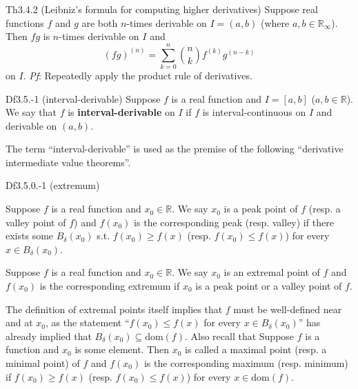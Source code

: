 \documentclass{article}
\begin{document}
\begin{Th}{Th3.4.2 (Leibniz's formula for computing higher derivatives)}
    Suppose real functions $f$ and $g$ are both $n$-times derivable on $I = (a,b)$ (where $a, b\in\mathbb{R}_\infty$). Then $fg$ is $n$-times derivable on $I$ and
    $$ (fg)^{(n)} = \sum_{k=0}^n \binom{n}{k} f^{(k)}g^{(n-k)}$$
    on $I$.
    \tcblower
    \textit{Pf}: Repeatedly apply the product rule of derivatives.
\end{Th}

\begin{Df}{Df3.5.-1 (interval-derivable)}
    Suppose $f$ is a real function and $I=[a,b]$ ($a,b\in\mathbb{R}$). We say that $f$ is \textbf{interval-derivable} on $I$ if $f$ is interval-continuous on $I$ and derivable on $(a,b)$.
\end{Df}

\begin{Rmk}{}
    The term ``interval-derivable'' is used as the premise of the following ``derivative intermediate value theorems''.
\end{Rmk}

\begin{Df}{Df3.5.0.-1 (extremum)}
    \begin{compactenum}
        \item Suppose $f$ is a real function and $x_0\in\mathbb{R}$. We say $x_0$ is a peak point of $f$ (resp. a valley point of $f$) and $f(x_0)$ is the corresponding peak (resp. valley) if there exists some $B_\delta(x_0)$ s.t. $f(x_0)\geq f(x)$ (resp. $f(x_0)\leq f(x)$) for every $x\in B_\delta(x_0)$.
        \item Suppose $f$ is a real function and $x_0\in\mathbb{R}$. We say $x_0$ is an extremal point of $f$ and $f(x_0)$ is the corresponding extremum if $x_0$ is a peak point or a valley point of $f$.
    \end{compactenum}
\end{Df}

\begin{Rmk}{}
    \textcolor{Th}{The definition of extremal points itself implies that $f$ must be well-defined near and at $x_0$,} as the statement ``$f(x_0)\leq f(x)$ for every $x\in B_\delta(x_0)$'' has already implied that $B_\delta(x_0)\subseteq\text{dom}(f)$. Also recall that \textcolor{Df}{Suppose $f$ is a function and $x_0$ is some element. Then $x_0$ is called a maximal point (resp. a minimal point) of $f$ and $f(x_0)$ is the corresponding maximum (resp. minimum) if $f(x_0)\geq f(x)$ (resp. $f(x_0)\leq f(x)$) for every $x\in \text{dom}(f)$.}
\end{Rmk}
\end{document}
